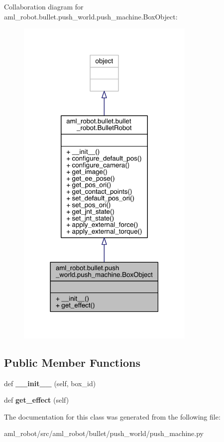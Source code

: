 Collaboration diagram for aml\+\_\+robot.\+bullet.\+push\+\_\+world.\+push\+\_\+machine.\+Box\+Object\+:
\nopagebreak
\begin{figure}[H]
\begin{center}
\leavevmode
\includegraphics[width=242pt]{classaml__robot_1_1bullet_1_1push__world_1_1push__machine_1_1_box_object__coll__graph}
\end{center}
\end{figure}
\subsection*{Public Member Functions}
\begin{DoxyCompactItemize}
\item 
\hypertarget{classaml__robot_1_1bullet_1_1push__world_1_1push__machine_1_1_box_object_a6176168fbcfdc9c0c09808bf93e01e78}{}\label{classaml__robot_1_1bullet_1_1push__world_1_1push__machine_1_1_box_object_a6176168fbcfdc9c0c09808bf93e01e78} 
def {\bfseries \+\_\+\+\_\+init\+\_\+\+\_\+} (self, box\+\_\+id)
\item 
\hypertarget{classaml__robot_1_1bullet_1_1push__world_1_1push__machine_1_1_box_object_afaf0ea1787cdeda8b5266f9a1d37e723}{}\label{classaml__robot_1_1bullet_1_1push__world_1_1push__machine_1_1_box_object_afaf0ea1787cdeda8b5266f9a1d37e723} 
def {\bfseries get\+\_\+effect} (self)
\end{DoxyCompactItemize}


The documentation for this class was generated from the following file\+:\begin{DoxyCompactItemize}
\item 
aml\+\_\+robot/src/aml\+\_\+robot/bullet/push\+\_\+world/push\+\_\+machine.\+py\end{DoxyCompactItemize}
